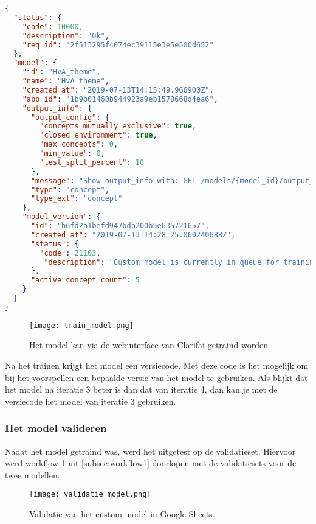\begin{lstlisting}[language=json,caption=Antwoord van de API nadat het model getraind werd]
{
  "status": {
    "code": 10000,
    "description": "Ok",
    "req_id": "2f513295f4074ec39115e3e5e500d652"
  },
  "model": {
    "id": "HvA_theme",
    "name": "HvA_theme",
    "created_at": "2019-07-13T14:15:49.966900Z",
    "app_id": "1b9b01460b944923a9eb1578668d4ea6",
    "output_info": {
      "output_config": {
        "concepts_mutually_exclusive": true,
        "closed_environment": true,
        "max_concepts": 0,
        "min_value": 0,
        "test_split_percent": 10
      },
      "message": "Show output_info with: GET /models/{model_id}/output_info",
      "type": "concept",
      "type_ext": "concept"
    },
    "model_version": {
      "id": "b6fd2a1befd947bdb200b5e635721657",
      "created_at": "2019-07-13T14:28:25.060240688Z",
      "status": {
        "code": 21103,
         "description": "Custom model is currently in queue for training, waiting on inputs to process."
      },
      "active_concept_count": 5
    }
  }
}
\end{lstlisting}

\begin{figure}[h]
	\centering
	\texttt{[image: train\_model.png]}\hfill
	\caption[Het model trainen via de webinterface]{Het model kan via de webinterface van Clarifai getraind worden.}
	\label{fig:model-trainen}
\end{figure}

Na het trainen krijgt het model een versiecode. Met deze code is het mogelijk om bij het voorspellen een bepaalde versie van het model te gebruiken. Als blijkt dat het model na iteratie 3 beter is dan dat van iteratie 4, dan kan je met de versiecode het model van iteratie 3 gebruiken.

\subsubsection{Het model valideren}
\label{subsubsec:model-valideren}

Nadat het model getraind was, werd het uitgetest op de validatieset. Hiervoor werd workflow 1 uit \ref{subsec:workflow1} doorlopen met de validatiesets voor de twee modellen.

\begin{figure}
	\centering
	\texttt{[image: validatie\_model.png]}\hfill
	\caption[Validatie van het custom model]{Validatie van het custom model in Google Sheets.}
	\label{fig:validatie-model}
\end{figure}


